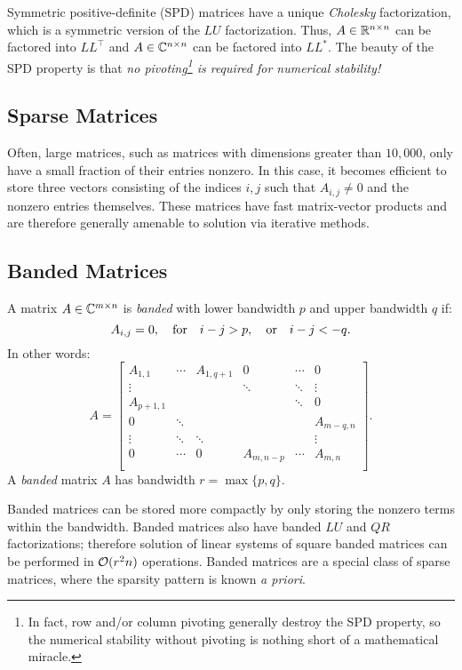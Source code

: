 Symmetric positive-definite (SPD) matrices have a unique {\em Cholesky} factorization, which is a symmetric version of the $LU$ factorization. Thus, $A\in\mathbb{R}^{n\times n}$ can be factored into $LL^\top$ and $A\in\mathbb{C}^{n\times n}$ can be factored into $LL^*$. The beauty of the SPD property is that {\em no pivoting\footnote{In fact, row and/or column pivoting generally destroy the SPD property, so the numerical stability without pivoting is nothing short of a mathematical miracle.} is required for numerical stability!}

\subsection{Sparse Matrices}

Often, large matrices, such as matrices with dimensions greater than $10,000$, only have a small fraction of their entries nonzero. In this case, it becomes efficient to store three vectors consisting of the indices $i,j$ such that $A_{i,j}\ne0$ and the nonzero entries themselves. These matrices have fast matrix-vector products and are therefore generally amenable to solution via iterative methods.

\subsection{Banded Matrices}

\begin{definition}
A matrix $A\in\mathbb{C}^{m\times n}$ is {\em banded} with lower bandwidth $p$ and upper bandwidth $q$ if:
\[
A_{i,j} = 0,\quad{\rm for}\quad i-j > p,\quad{\rm or}\quad i-j < -q.
\]
In other words:
\[
A = \begin{bmatrix}
A_{1,1} & \cdots & A_{1,q+1} & 0 & \cdots & 0\\
\vdots & & & \ddots & \ddots & \vdots\\
A_{p+1,1} & & & & \ddots & 0\\
0 & \ddots & & & & A_{m-q,n}\\
\vdots & \ddots & \ddots & & & \vdots\\
0 & \cdots & 0 & A_{m,n-p} & \cdots & A_{m,n}\\
\end{bmatrix}.
\]
A {\em banded} matrix $A$ has bandwidth $r = \max\{p,q\}$.
\end{definition}

Banded matrices can be stored more compactly by only storing the nonzero terms within the bandwidth. Banded matrices also have banded $LU$ and $QR$ factorizations; therefore solution of linear systems of square banded matrices can be performed in $\mathcal{O}(r^2n)$ operations. Banded matrices are a special class of sparse matrices, where the sparsity pattern is known {\em a priori}.

